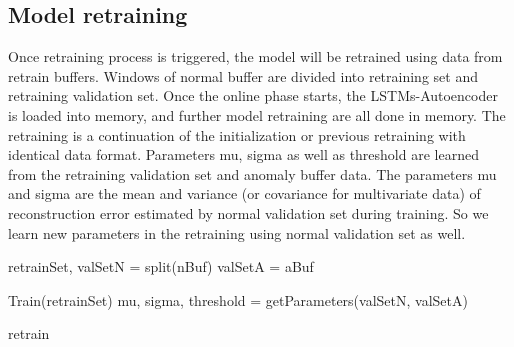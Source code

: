 \subsection{Model retraining}
\label{retraining}

Once retraining process is triggered, the model will be retrained using data from retrain buffers. Windows of normal buffer are divided into retraining set and retraining validation set. Once the online phase starts, the LSTMs-Autoencoder is loaded into memory, and further model retraining are all done in memory. The retraining is a continuation of the initialization or previous retraining with identical data format. Parameters mu, sigma as well as threshold are learned from the retraining validation set and anomaly buffer data. The parameters mu and sigma are the mean and variance (or covariance for multivariate data) of reconstruction error estimated by normal validation set during training. So we learn new parameters in the retraining using normal validation set as well.

\begin{algorithm}[h]

\BlankLine 
retrainSet, valSetN = split(nBuf)\;
valSetA = aBuf\;

Train(retrainSet)\;
mu, sigma, threshold = getParameters(valSetN, valSetA)

\caption{retrain}
\label{alg:retrain}
\end{algorithm}




